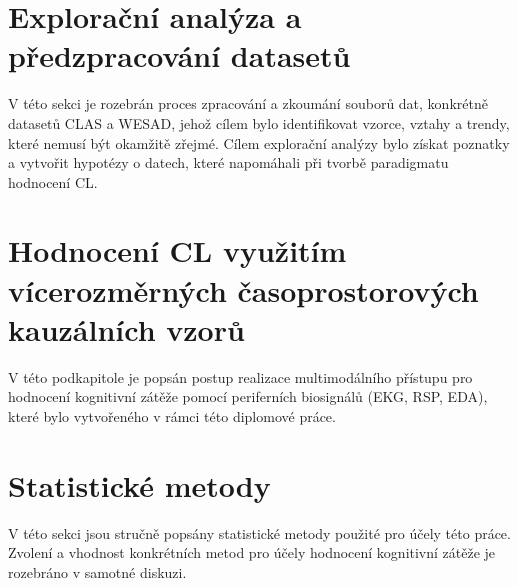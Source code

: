 \section{Explorační analýza a předzpracování datasetů}
\label{sec:exploracni_analyza}
V této sekci je rozebrán proces zpracování a zkoumání souborů dat, konkrétně
datasetů CLAS a WESAD, jehož cílem bylo identifikovat vzorce, vztahy a trendy,
které nemusí být okamžitě zřejmé. Cílem explorační analýzy bylo získat poznatky
a vytvořit hypotézy o datech, které napomáhali při tvorbě paradigmatu hodnocení \gls{CL}.


\section{Hodnocení CL využitím vícerozměrných časoprostorových kauzálních vzorů}
\label{sec:hybridni_detekce}
V této podkapitole je popsán postup realizace multimodálního přístupu pro
hodnocení kognitivní zátěže pomocí periferních biosignálů (\gls{EKG}, \gls{RSP},
\gls{EDA}), které bylo vytvořeného v rámci této diplomové práce.


\section{Statistické metody}
\label{sec:statisticke_metody}
V této sekci jsou stručně popsány statistické metody použité pro účely této
práce. Zvolení a vhodnost konkrétních metod pro účely hodnocení kognitivní
zátěže je rozebráno v samotné diskuzi.


% 

% 

% 

